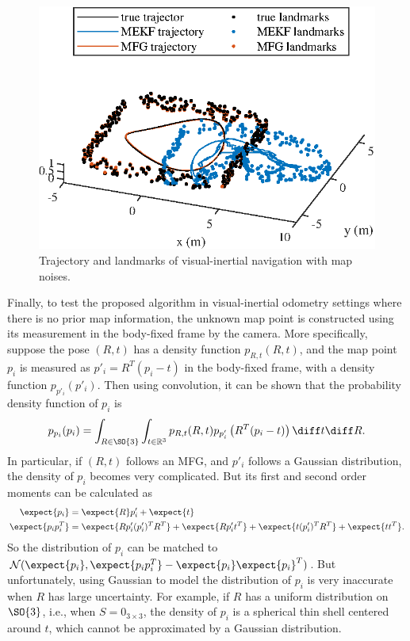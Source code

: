 \begin{figure}
	\centering
	\includegraphics[scale=1.2]{figures/VIO-map-filter-trajectory1}
	\caption{Trajectory and landmarks of visual-inertial navigation with map noises.}
	\label{fig:VIO-map-filter-trajectory1}
\end{figure}

Finally, to test the proposed algorithm in visual-inertial odometry settings where there is no prior map information, the unknown map point is constructed using its measurement in the body-fixed frame by the camera.
More specifically, suppose the pose $(R,t)$ has a density function $p_{R,t}(R,t)$, and the map point $p_i$ is measured as $p'_i = R^T(p_i-t)$ in the body-fixed frame, with a density function $p_{p'_i}(p'_i)$.
Then using convolution, it can be shown that the probability density function of $p_i$ is
\begin{align} \label{eqn:VIO-transformPoint}
	p_{p_i}(p_i) = \int_{R\in\SO{3}} \int_{t\in\mathbb{R}^3} p_{R,t}(R,t) p_{p'_i}\left( R^T(p_i-t) \right) \diff t \diff R.
\end{align}
In particular, if $(R,t)$ follows an MFG, and $p'_i$ follows a Gaussian distribution, the density of $p_i$ becomes very complicated.
But its first and second order moments can be calculated as
\begin{align}
	\expect{p_i} &= \expect{R}p'_i + \expect{t} \\
	\expect{p_ip_i^T} &= \expect{Rp'_i(p'_i)^TR^T} + \expect{Rp'_it^T} + \expect{t(p'_i)^TR^T} + \expect{tt^T}.
\end{align}
So the distribution of $p_i$ can be matched to $\mathcal{N}(\expect{p_i}, \expect{p_ip_i^T}-\expect{p_i}\expect{p_i}^T)$.
But unfortunately, using Gaussian to model the distribution of $p_i$ is very inaccurate when $R$ has large uncertainty.
For example, if $R$ has a uniform distribution on $\SO{3}$, i.e., when $S = 0_{3\times 3}$, the density of $p_i$ is a spherical thin shell centered around $t$, which cannot be approximated by a Gaussian distribution.

